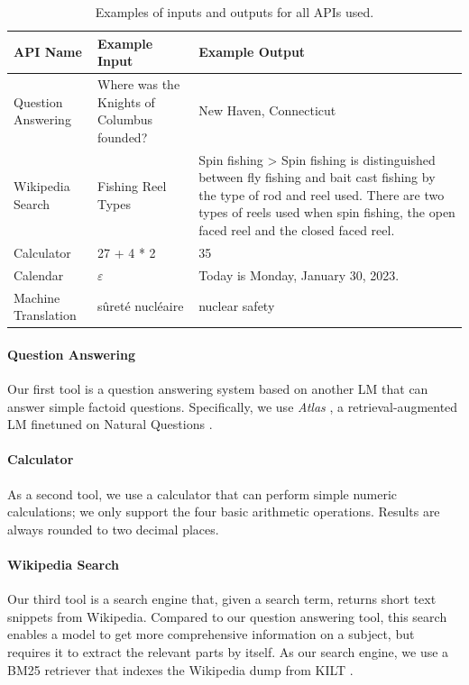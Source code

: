 \documentclass[11pt]{article}
\begin{document}
\begin{CJK*}{UTF8}{gbsn}
\begin{table}
\small
\begin{tabularx}{\linewidth}{lp{3cm}X}
\toprule
\textbf{API Name} & \textbf{Example Input} & \textbf{Example Output} \\
\midrule
Question Answering & Where was the Knights of Columbus founded? & New Haven, Connecticut \\\addlinespace[0.2cm]
Wikipedia Search & Fishing Reel Types & Spin fishing > Spin fishing is distinguished between fly fishing and bait cast fishing by the type of rod and reel used. There are two types of reels used when spin fishing, the open faced reel and the closed faced reel. \\\addlinespace[0.2cm]
Calculator & 27 + 4 * 2 & 35 \\\addlinespace[0.2cm]
Calendar & $\varepsilon$ & Today is Monday, January 30, 2023. \\\addlinespace[0.2cm]
Machine Translation & sûreté nucléaire & nuclear safety \\
\bottomrule
\end{tabularx}
\caption{Examples of inputs and outputs for all APIs used.}
\label{tab:tool-examples}
\end{table}

\paragraph{Question Answering} Our first tool is a question answering system based on another LM that can answer simple factoid questions. Specifically, we use \emph{Atlas} \citep{izacard2022atlas}, a retrieval-augmented LM finetuned on Natural Questions \citep{kwiatkowski-etal-2019-natural}.

\paragraph{Calculator} As a second tool, we use a calculator that can perform simple numeric calculations; we only support the four basic arithmetic operations. Results are always rounded to two decimal places.

\paragraph{Wikipedia Search} Our third tool is a search engine that, given a search term, returns short text snippets from Wikipedia. Compared to our question answering tool, this search enables a model to get more comprehensive information on a subject, but requires it to extract the relevant parts by itself. As our search engine, we use a BM25 retriever \citep{robertson1995okapi,baeza1999modern} that indexes the Wikipedia dump from KILT \citep{petroni-etal-2021-kilt}.


\end{CJK*}
\end{document}
